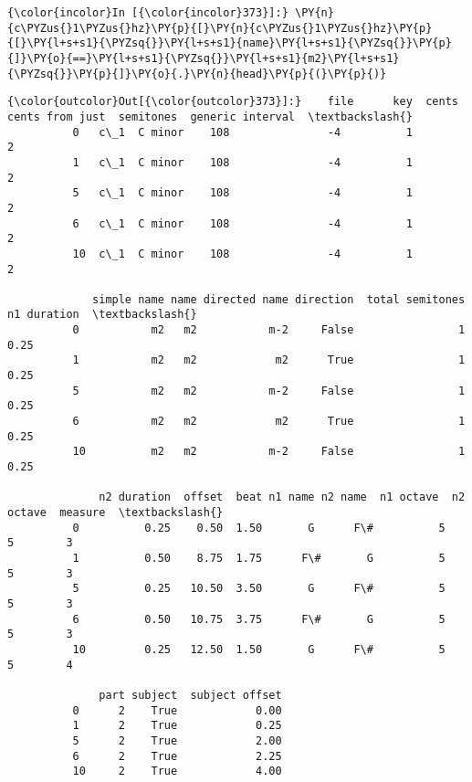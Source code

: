     \begin{Verbatim}[commandchars=\\\{\}]
{\color{incolor}In [{\color{incolor}373}]:} \PY{n}{c\PYZus{}1\PYZus{}hz}\PY{p}{[}\PY{n}{c\PYZus{}1\PYZus{}hz}\PY{p}{[}\PY{l+s+s1}{\PYZsq{}}\PY{l+s+s1}{name}\PY{l+s+s1}{\PYZsq{}}\PY{p}{]}\PY{o}{==}\PY{l+s+s1}{\PYZsq{}}\PY{l+s+s1}{m2}\PY{l+s+s1}{\PYZsq{}}\PY{p}{]}\PY{o}{.}\PY{n}{head}\PY{p}{(}\PY{p}{)}
\end{Verbatim}
\begin{Verbatim}[commandchars=\\\{\}]
{\color{outcolor}Out[{\color{outcolor}373}]:}    file      key  cents  cents from just  semitones  generic interval  \textbackslash{}
          0   c\_1  C minor    108               -4          1                 2   
          1   c\_1  C minor    108               -4          1                 2   
          5   c\_1  C minor    108               -4          1                 2   
          6   c\_1  C minor    108               -4          1                 2   
          10  c\_1  C minor    108               -4          1                 2   
          
             simple name name directed name direction  total semitones  n1 duration  \textbackslash{}
          0           m2   m2           m-2     False                1         0.25   
          1           m2   m2            m2      True                1         0.25   
          5           m2   m2           m-2     False                1         0.25   
          6           m2   m2            m2      True                1         0.25   
          10          m2   m2           m-2     False                1         0.25   
          
              n2 duration  offset  beat n1 name n2 name  n1 octave  n2 octave  measure  \textbackslash{}
          0          0.25    0.50  1.50       G      F\#          5          5        3   
          1          0.50    8.75  1.75      F\#       G          5          5        3   
          5          0.25   10.50  3.50       G      F\#          5          5        3   
          6          0.50   10.75  3.75      F\#       G          5          5        3   
          10         0.25   12.50  1.50       G      F\#          5          5        4   
          
              part subject  subject offset  
          0      2    True            0.00  
          1      2    True            0.25  
          5      2    True            2.00  
          6      2    True            2.25  
          10     2    True            4.00  
\end{Verbatim}
